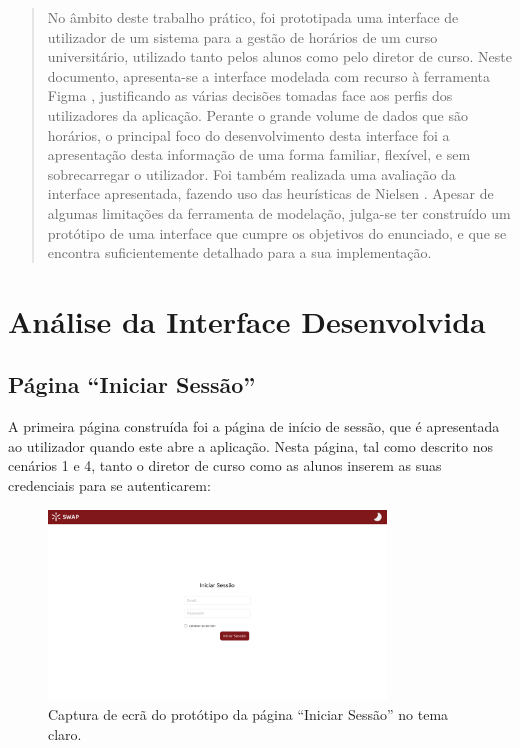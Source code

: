 \documentclass[12pt, a4paper]{article}
\begin{document}
\begin{abstract}
    \noindent
    No âmbito deste trabalho prático, foi prototipada uma interface de utilizador de um sistema para
    a gestão de horários de um curso universitário, utilizado tanto pelos alunos como pelo diretor
    de curso. Neste documento, apresenta-se a interface modelada com recurso à ferramenta Figma
    \cite{figma}, justificando as várias decisões tomadas face aos perfis dos utilizadores da
    aplicação. Perante o grande volume de dados que são horários, o principal foco do
    desenvolvimento desta interface foi a apresentação desta informação de uma forma familiar,
    flexível, e sem sobrecarregar o utilizador. Foi também realizada uma avaliação da interface
    apresentada, fazendo uso das heurísticas de Nielsen \cite{nielsen}. Apesar de algumas limitações
    da ferramenta de modelação, julga-se ter construído um protótipo de uma interface que cumpre os
    objetivos do enunciado, e que se encontra suficientemente detalhado para a sua implementação.
\end{abstract}

\section{Análise da Interface Desenvolvida}

\subsection{Página ``Iniciar Sessão''}

A primeira página construída foi a página de início de sessão, que é apresentada ao utilizador
quando este abre a aplicação. Nesta página, tal como descrito nos cenários 1 e 4, tanto o diretor
de curso como as alunos inserem as suas credenciais para se autenticarem:

\begin{figure}[H]
    \centering
    \includegraphics[width=0.8\textwidth]{res/prototype/iniciar-sessao.png}
    \caption{Captura de ecrã do protótipo da página ``Iniciar Sessão'' no tema claro.}
    \label{iniciar-sessao}
\end{figure}
\end{document}
